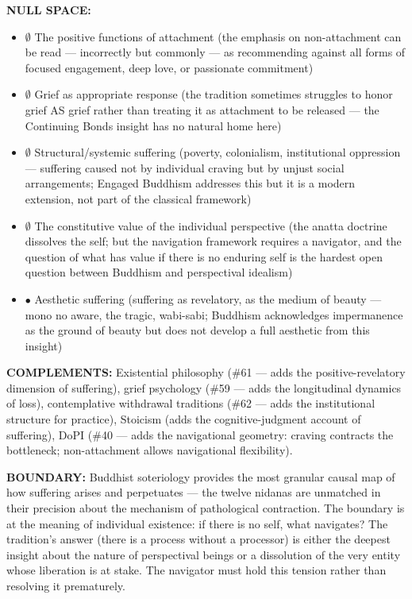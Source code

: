 \textbf{NULL SPACE:}

\begin{itemize}[nosep,leftmargin=*]
  \item $\emptyset$ The positive functions of attachment (the emphasis on non-attachment can be read — incorrectly but commonly — as recommending against all forms of focused engagement, deep love, or passionate commitment)
  \item $\emptyset$ Grief as appropriate response (the tradition sometimes struggles to honor grief AS grief rather than treating it as attachment to be released — the Continuing Bonds insight has no natural home here)
  \item $\emptyset$ Structural/systemic suffering (poverty, colonialism, institutional oppression — suffering caused not by individual craving but by unjust social arrangements; Engaged Buddhism addresses this but it is a modern extension, not part of the classical framework)
  \item $\emptyset$ The constitutive value of the individual perspective (the anatta doctrine dissolves the self; but the navigation framework requires a navigator, and the question of what has value if there is no enduring self is the hardest open question between Buddhism and perspectival idealism)
  \item $\bullet$ Aesthetic suffering (suffering as revelatory, as the medium of beauty — mono no aware, the tragic, wabi-sabi; Buddhism acknowledges impermanence as the ground of beauty but does not develop a full aesthetic from this insight)
\end{itemize}


\textbf{COMPLEMENTS:} Existential philosophy (\#61 — adds the positive-revelatory dimension of suffering), grief psychology (\#59 — adds the longitudinal dynamics of loss), contemplative withdrawal traditions (\#62 — adds the institutional structure for practice), Stoicism (adds the cognitive-judgment account of suffering), DoPI (\#40 — adds the navigational geometry: craving contracts the bottleneck; non-attachment allows navigational flexibility).


\textbf{BOUNDARY:} Buddhist soteriology provides the most granular causal map of how suffering arises and perpetuates — the twelve nidanas are unmatched in their precision about the mechanism of pathological contraction. The boundary is at the meaning of individual existence: if there is no self, what navigates? The tradition's answer (there is a process without a processor) is either the deepest insight about the nature of perspectival beings or a dissolution of the very entity whose liberation is at stake. The navigator must hold this tension rather than resolving it prematurely.


